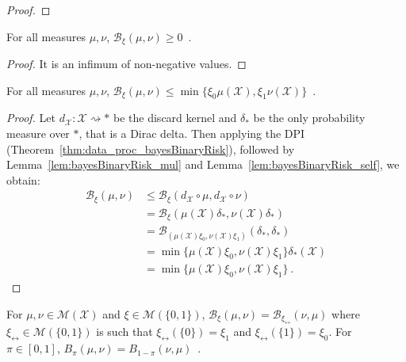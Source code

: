 \begin{proof}\leanok
\uses{}
\end{proof}

\begin{lemma}
  \label{lem:bayesBinaryRisk_nonneg}
  For all measures $\mu, \nu$, $\mathcal B_\xi(\mu, \nu) \ge 0$~.
\end{lemma}

\begin{proof}%
\uses{}
It is an infimum of non-negative values.
\end{proof}

\begin{lemma}
  \label{lem:bayesBinaryRisk_le}
  \leanok
  For all measures $\mu, \nu$, $\mathcal B_\xi(\mu, \nu) \le \min\{\xi_0 \mu(\mathcal X), \xi_1 \nu(\mathcal X)\}$~.
\end{lemma}

\begin{proof}\leanok
{}
Let $d_{\mathcal X} : \mathcal X \rightsquigarrow *$ be the discard kernel and $\delta_*$ be the only probability measure over $*$, that is a Dirac delta.
Then applying the DPI (Theorem~\ref{thm:data_proc_bayesBinaryRisk}), followed by Lemma~\ref{lem:bayesBinaryRisk_mul} and Lemma~\ref{lem:bayesBinaryRisk_self}, we obtain:
\begin{align*}
\mathcal B_\xi(\mu, \nu)
&\le \mathcal B_\xi(d_{\mathcal X} \circ \mu, d_{\mathcal X} \circ \nu)
\\
&= \mathcal B_\xi(\mu(\mathcal X) \delta_*, \nu(\mathcal X) \delta_*)
\\
&= \mathcal B_{(\mu(\mathcal X) \xi_0, \nu(\mathcal X) \xi_1)}(\delta_*, \delta_*)
\\
&= \min\{\mu(\mathcal X) \xi_0, \nu(\mathcal X) \xi_1\} \delta_*(\mathcal X)
\\
&= \min\{\mu(\mathcal X) \xi_0, \nu(\mathcal X) \xi_1\}
\: .
\end{align*}
\end{proof}

\begin{lemma}
  \label{lem:bayesBinaryRisk_symm}
  \leanok
  For $\mu, \nu \in \mathcal M(\mathcal X)$ and $\xi \in \mathcal M(\{0,1\})$, $\mathcal B_\xi(\mu, \nu) = \mathcal B_{\xi_{\leftrightarrow}}(\nu, \mu)$ where $\xi_{\leftrightarrow} \in \mathcal M(\{0,1\})$ is such that $\xi_{\leftrightarrow}(\{0\}) = \xi_1$ and $\xi_{\leftrightarrow}(\{1\}) = \xi_0$.
  For $\pi \in [0,1]$, $B_\pi(\mu, \nu) = B_{1 - \pi}(\nu, \mu)$~.
\end{lemma}

